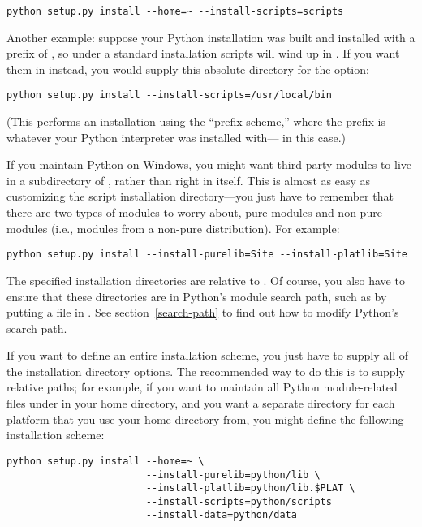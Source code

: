 \documentclass{howto}
\begin{document}
\begin{verbatim}
python setup.py install --home=~ --install-scripts=scripts
\end{verbatim}

Another \UNIX{} example: suppose your Python installation was built and
installed with a prefix of , so under a standard 
installation scripts will wind up in .  If
you want them in  instead, you would supply this
absolute directory for the  option:

\begin{verbatim}
python setup.py install --install-scripts=/usr/local/bin
\end{verbatim}

(This performs an installation using the ``prefix scheme,'' where the
prefix is whatever your Python interpreter was installed with---
 in this case.)

If you maintain Python on Windows, you might want third-party modules to
live in a subdirectory of , rather than right in
 itself.  This is almost as easy as customizing the
script installation directory---you just have to remember that there are
two types of modules to worry about, pure modules and non-pure modules
(i.e., modules from a non-pure distribution).  For example:

\begin{verbatim}
python setup.py install --install-purelib=Site --install-platlib=Site
\end{verbatim}

The specified installation directories are relative to
.  Of course, you also have to ensure that these
directories are in Python's module search path, such as by putting a
 file in .  See section~\ref{search-path}
to find out how to modify Python's search path.

If you want to define an entire installation scheme, you just have to
supply all of the installation directory options.  The recommended way
to do this is to supply relative paths; for example, if you want to
maintain all Python module-related files under  in your
home directory, and you want a separate directory for each platform that
you use your home directory from, you might define the following
installation scheme:

\begin{verbatim}
python setup.py install --home=~ \
                        --install-purelib=python/lib \
                        --install-platlib=python/lib.$PLAT \
                        --install-scripts=python/scripts
                        --install-data=python/data
\end{verbatim}
\end{document}
